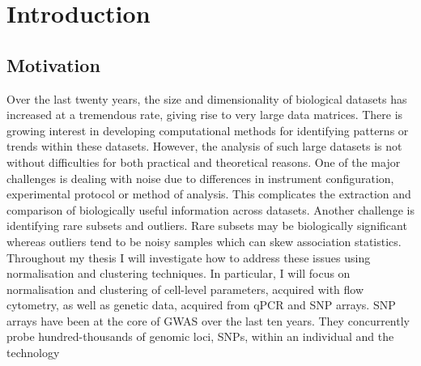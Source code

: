 %

\chapter[Introduction]{ \label{chapter:intro} Introduction}

\section{Motivation}

Over the last twenty years, the size and dimensionality of biological datasets has increased at a tremendous rate,
giving rise to very large data matrices.
There is growing interest in developing computational methods for identifying patterns or trends 
within these datasets.
However, the analysis of such large datasets is not without difficulties for both practical and theoretical reasons.
One of the major challenges is dealing with noise due to differences in instrument configuration, experimental protocol or method of analysis.
This complicates the extraction and comparison of biologically useful information across datasets.
Another challenge is identifying rare subsets and outliers.
Rare subsets may be biologically significant whereas outliers tend to be noisy samples which can skew association statistics.
Throughout my thesis I will investigate how to address these issues using normalisation and clustering techniques.
In particular, I will focus on normalisation and clustering of cell-level parameters, acquired with flow cytometry,
as well as genetic data, acquired from \gls{qPCR} and \gls{SNP} arrays.  
\gls{SNP} arrays have been at the core of \gls{GWAS} over the last ten years.
They concurrently probe hundred-thousands of genomic loci, \glspl{SNP}, within an individual and the technology
